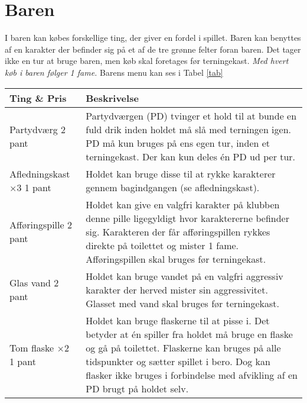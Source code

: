 
\section{Baren}
I baren kan købes forskellige ting, der giver en fordel i spillet. Baren kan benyttes af en karakter der befinder sig på et af de tre grønne felter foran baren. Det tager ikke en tur at bruge baren, men køb skal foretages før terningekast. \textit{Med hvert køb i baren følger 1 fame.} Barens menu kan ses i Tabel \ref{tab}

\begin{Figure}
\centering
\begin{tabular}{p{}|p{}}
\textbf{Ting \& Pris} & \textbf{Beskrivelse} \\\hline

Partydværg \hspace{0.2cm} 2 pant & Partydværgen (PD) tvinger et hold til at bunde en fuld drik inden holdet må slå med terningen igen. PD må kun bruges på ens egen tur, inden et terningekast. Der kan kun deles én PD ud per tur.\\\hline

Afledningskast $\times 3$ \hspace{2cm} 1 pant & Holdet kan bruge disse til at rykke karakterer gennem bagindgangen (se afledningskast). \\\hline

Afføringspille \hspace{2cm} 2 pant & Holdet kan give en valgfri karakter på klubben denne pille ligegyldigt hvor karaktererne befinder sig. Karakteren der får afføringspillen rykkes direkte på toilettet og mister 1 fame. Afføringspillen skal bruges før terningekast. \\\hline


Glas vand \hspace{2cm} \hfill 2 pant & Holdet kan bruge vandet på en valgfri aggressiv karakter der herved mister sin aggressivitet. Glasset med vand skal bruges før terningekast. \\\hline


Tom flaske $\times 2$ \hspace{2cm} 1 pant & Holdet kan bruge flaskerne til at pisse i. Det betyder at én spiller fra holdet må bruge en flaske og gå på toilettet. Flaskerne kan bruges på alle tidspunkter og sætter spillet i bero. Dog kan flasker ikke bruges i forbindelse med afvikling af en PD brugt på holdet selv. \\\hline
\end{tabular}
\label{tab}
\end{Figure}